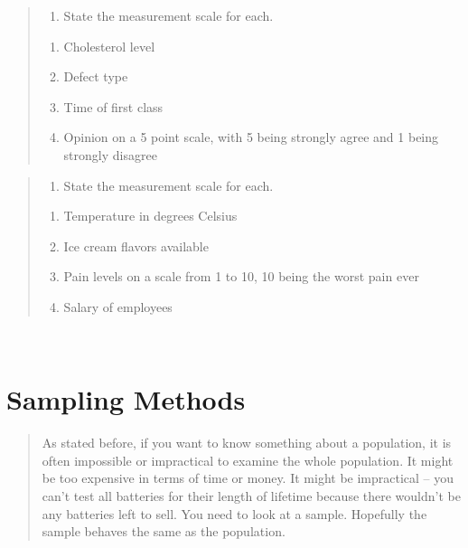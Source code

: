 \documentclass[]{book}
\providecommand{\tightlist}{%
  \setlength{\itemsep}{0pt}\setlength{\parskip}{0pt}}
\begin{document}
\begin{quote}
\begin{enumerate}
\def\labelenumi{\arabic{enumi}.}
\setcounter{enumi}{8}
\tightlist
\item
  State the measurement scale for each.
\end{enumerate}

\begin{enumerate}
\def\labelenumi{\alph{enumi}.}
\tightlist
\item
  Cholesterol level
\item
  Defect type
\item
  Time of first class
\item
  Opinion on a 5 point scale, with 5 being strongly agree and 1 being
  strongly disagree
\end{enumerate}
\end{quote}

\begin{quote}
\begin{enumerate}
\def\labelenumi{\arabic{enumi}.}
\setcounter{enumi}{9}
\tightlist
\item
  State the measurement scale for each.
\end{enumerate}

\begin{enumerate}
\def\labelenumi{\alph{enumi}.}
\tightlist
\item
  Temperature in degrees Celsius
\item
  Ice cream flavors available
\item
  Pain levels on a scale from 1 to 10, 10 being the worst pain ever
\item
  Salary of employees
\end{enumerate}
\end{quote}

\textbf{\\
}

\hypertarget{sampling-methods}{%
\section{Sampling Methods}\label{sampling-methods}}

\begin{quote}
As stated before, if you want to know something about a population, it is often impossible or impractical to examine the whole population. It might be too expensive in terms of time or money. It might be impractical -- you can't test all batteries for their length of lifetime because there wouldn't be any batteries left to sell. You need to look at a sample. Hopefully the sample behaves the same as the population.
\end{quote}
\end{document}

